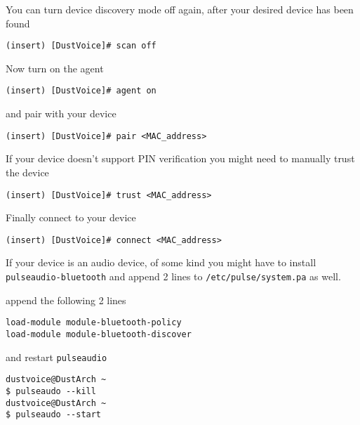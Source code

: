 \documentclass[9pt]{report}
\newenvironment{NOTE}
{\begin{tcolorbox}[colback=admonitionBG,coltitle=draculaFG,colframe=draculaBlue,colbacktitle=draculaBlue,title=NOTE]}
{\end{tcolorbox}}
\begin{document}
\begin{NOTE}
    You can turn device discovery mode off again, after your desired device has been found


    \begin{verbatim}
(insert) [DustVoice]# scan off
    \end{verbatim}
\end{NOTE}

Now turn on the agent


\begin{verbatim}
(insert) [DustVoice]# agent on
\end{verbatim}

and pair with your device


\begin{verbatim}
(insert) [DustVoice]# pair <MAC_address>
\end{verbatim}

\begin{NOTE}
    If your device doesn’t support PIN verification you might need to manually trust the device


    \begin{verbatim}
(insert) [DustVoice]# trust <MAC_address>
    \end{verbatim}
\end{NOTE}

Finally connect to your device


\begin{verbatim}
(insert) [DustVoice]# connect <MAC_address>
\end{verbatim}

\begin{NOTE}
    If your device is an audio device, of some kind you might have to install \texttt{pulseaudio-bluetooth} and append 2 lines to \texttt{/etc/pulse/system.pa} as well.


    append the following 2 lines


    \begin{verbatim}
load-module module-bluetooth-policy
load-module module-bluetooth-discover
    \end{verbatim}

    and restart \texttt{pulseaudio}

    \begin{verbatim}
dustvoice@DustArch ~
$ pulseaudo --kill
dustvoice@DustArch ~
$ pulseaudo --start
    \end{verbatim}
\end{NOTE}
\end{document}
